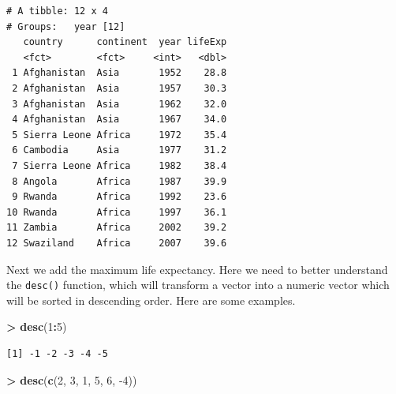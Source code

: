 \documentclass[]{krantz}
\makeatletter
\newenvironment{Shaded}{\begin{snugshade}}{\end{snugshade}}
\newcommand{\DecValTok}[1]{\textcolor[rgb]{0.06,0.06,0.06}{#1}}
\newcommand{\KeywordTok}[1]{\textcolor[rgb]{0.27,0.27,0.27}{\textbf{#1}}}
\newcommand{\NormalTok}[1]{#1}
\newcommand{\OperatorTok}[1]{\textcolor[rgb]{0.43,0.43,0.43}{\textbf{#1}}}
\newcommand{\StringTok}[1]{\textcolor[rgb]{0.5,0.5,0.5}{#1}}
\newenvironment{kframe}{%
\medskip{}
\setlength{\fboxsep}{.8em}
 \def\at@end@of@kframe{}%
 \ifinner\ifhmode%
  \def\at@end@of@kframe{\end{minipage}}%
  \begin{minipage}{\columnwidth}%
 \fi\fi%
 \def\FrameCommand##1{\hskip\@totalleftmargin \hskip-\fboxsep
 \colorbox{shadecolor}{##1}\hskip-\fboxsep
     \hskip-\linewidth \hskip-\@totalleftmargin \hskip\columnwidth}%
 \MakeFramed {\advance\hsize-\width
   \@totalleftmargin\z@ \linewidth\hsize
   \@setminipage}}%
 {\par\unskip\endMakeFramed%
 \at@end@of@kframe}
\renewenvironment{Shaded}{\begin{kframe}}{\end{kframe}}
\makeatother
\begin{document}
\begin{Shaded}
\end{Shaded}

\begin{verbatim}
# A tibble: 12 x 4
# Groups:   year [12]
   country      continent  year lifeExp
   <fct>        <fct>     <int>   <dbl>
 1 Afghanistan  Asia       1952    28.8
 2 Afghanistan  Asia       1957    30.3
 3 Afghanistan  Asia       1962    32.0
 4 Afghanistan  Asia       1967    34.0
 5 Sierra Leone Africa     1972    35.4
 6 Cambodia     Asia       1977    31.2
 7 Sierra Leone Africa     1982    38.4
 8 Angola       Africa     1987    39.9
 9 Rwanda       Africa     1992    23.6
10 Rwanda       Africa     1997    36.1
11 Zambia       Africa     2002    39.2
12 Swaziland    Africa     2007    39.6
\end{verbatim}

Next we add the maximum life expectancy. Here we need to better understand the \texttt{desc()} function, which will transform a vector into a numeric vector which will be sorted in descending order. Here are some examples.

\begin{Shaded}
\begin{Highlighting}[]
\OperatorTok{>}\StringTok{ }\KeywordTok{desc}\NormalTok{(}\DecValTok{1}\OperatorTok{:}\DecValTok{5}\NormalTok{)}
\end{Highlighting}
\end{Shaded}

\begin{verbatim}
[1] -1 -2 -3 -4 -5
\end{verbatim}

\begin{Shaded}
\begin{Highlighting}[]
\OperatorTok{>}\StringTok{ }\KeywordTok{desc}\NormalTok{(}\KeywordTok{c}\NormalTok{(}\DecValTok{2}\NormalTok{, }\DecValTok{3}\NormalTok{, }\DecValTok{1}\NormalTok{, }\DecValTok{5}\NormalTok{, }\DecValTok{6}\NormalTok{, }\DecValTok{-4}\NormalTok{))}
\end{Highlighting}
\end{Shaded}
\end{document}
